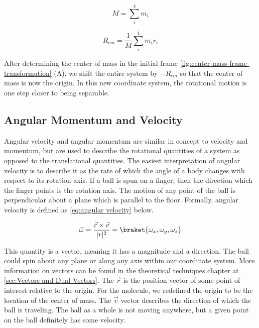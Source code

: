 \documentclass[11pt,a4paper]{book}
\begin{document}
			\begin{equation}
				\label{eq:total mass}
				M = \sum_i^4{m_i}
			\end{equation}
			
			\begin{equation}
				\label{eq:Center of Mass}
				R_{cm}=\dfrac{1}{M}\sum_i^4{m_ir_i} 
			\end{equation}

			After determining the center of mass in the initial frame \autoref{fig:center-mass-frame-transformation} (A), we shift the entire system by $-R_{cm}$ so that the center of mass is now the origin. In this new coordinate system, the rotational motion is one step closer to being separable.
			
		\subsection{Angular Momentum and Velocity}
			\label{subsec:Angular Momentum and Velocity}		
			Angular velocity and angular momentum are similar in concept to velocity and momentum, but are used to describe the rotational quantities of a system as opposed to the translational quantities. The easiest interpretation of angular velocity is to describe it as the rate of which the angle of a body changes with respect to its rotation axis. If a ball is spun on a finger, then the direction which the finger points is the rotation axis. The motion of any point of the ball is perpendicular about a plane which is parallel to the floor. Formally, angular velocity is defined as \autoref{eq:angular velocity} below.
			
			\begin{equation}
				\label{eq:angular velocity}
				\vec{\omega} = \dfrac{\vec{r} \times \vec{v}}{|r|^2}
				= \braket{\omega_x,\omega_y,\omega_z}
			\end{equation}
			
			This quantity is a vector, meaning it has a magnitude and a direction. The ball could spin about any plane or along any axis within our coordinate system. More information on vectors can be found in the theoretical techniques chapter at \autoref{sec:Vectors and Dual Vectors}. The $\vec{r}$ is the position vector of some point of interest relative to the origin. For the molecule, we redefined the origin to be the location of the center of mass. The $\vec{v}$ vector describes the direction of which the ball is traveling. The ball as a whole is not moving anywhere, but a given point on the ball definitely has some velocity.
			
\end{document}
